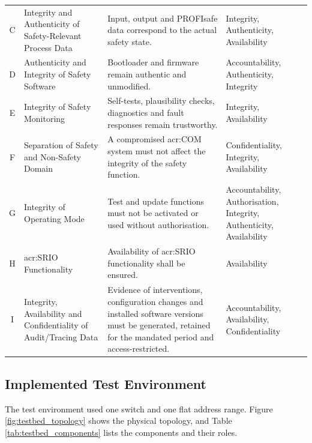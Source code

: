 {\begin{xltabular}{\textwidth}{@{} 
			c 
			>{\raggedright\arraybackslash{}\hsize}X 
			>{\raggedright\arraybackslash{}\hsize}X 
			>{\raggedright\arraybackslash{}\hsize}X 
			@{}}
		C & Integrity and Authenticity of Safety-Relevant Process Data & Input, output and PROFIsafe data correspond to the actual safety state. & Integrity, \newline Authenticity, \newline Availability \\ 
		
		D & Authenticity and Integrity of Safety Software & Bootloader and firmware remain authentic and unmodified. & Accountability, \newline Authenticity, \newline Integrity \\ 
		
		E & Integrity of Safety Monitoring & Self-tests, plausibility checks, diagnostics and fault responses remain trustworthy. & Integrity, \newline Availability \\ 
		
		F & Separation of Safety and Non-Safety Domain & A compromised \gls{acr:COM} system must not affect the integrity of the safety function. & Confidentiality, \newline Integrity, \newline Availability \\ 
		
		G & Integrity of Operating Mode & Test and update functions must not be activated or used without authorisation. & Accountability, \newline Authorisation, \newline Integrity, \newline Authenticity, \newline Availability \\ 
		
		H & \gls{acr:SRIO} Functionality & Availability of \gls{acr:SRIO} functionality shall be ensured. & Availability \\ 
		
		I & Integrity, Availability and Confidentiality of Audit/Tracing Data & Evidence of interventions, configuration changes and installed software versions must be generated, retained for the mandated period and access-restricted. & Accountability, \newline Availability, \newline Confidentiality \\
		
	\end{xltabular}
}


\subsection{Implemented Test Environment}
\label{subsec:realized_environment}
The test environment used one switch and one flat address range. Figure \ref{fig:testbed_topology} shows the physical topology, and Table \ref{tab:testbed_components} lists the components and their roles.

